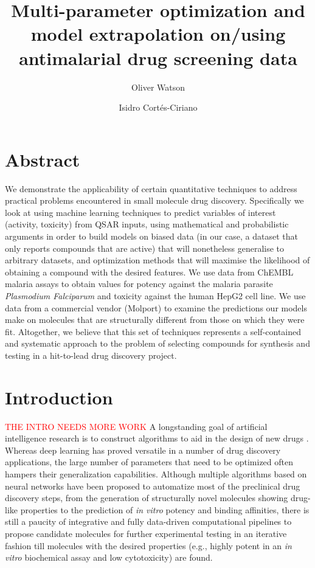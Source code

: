 \documentclass{article}
\title{Multi-parameter optimization and model extrapolation on/using antimalarial drug screening data}
\author[1]{Oliver Watson}
\author[2]{Isidro Cortés-Ciriano}
\affil[1]{Evariste Technologies Ltd}
\affil[2]{Centre for Molecular Informatics, Department of Chemistry, University of Cambridge, Lensfield Road, Cambridge, CB2 1EW, United Kingdom.}
\begin{document}

\maketitle

\section{Abstract}

We demonstrate the applicability of certain quantitative techniques to address practical problems encountered in small molecule drug discovery.  Specifically we look at using machine learning techniques to predict variables of interest (activity, toxicity) from QSAR inputs, using mathematical and probabilistic arguments in order to build models on biased data (in our case, a dataset that only reports compounds that are active) that will nonetheless generalise to arbitrary datasets, and optimization methods that will maximise the likelihood of obtaining a compound with the desired features.  We use data from ChEMBL malaria assays to obtain values for potency against the malaria parasite \textit{Plasmodium Falciparum} and toxicity against the human HepG2 cell line.  We use data from a commercial vendor (Molport) to examine the predictions our models make on 
molecules that are structurally  different from those on which they were fit. Altogether, we believe that this set of techniques represents a self-contained and systematic approach to the problem of selecting compounds for synthesis and testing in a hit-to-lead drug discovery project.
\newpage


\section{Introduction}
\textcolor{red}{THE INTRO NEEDS MORE WORK}
A longstanding goal of artificial intelligence research is to construct algorithms 
to aid in the design of new drugs \cite{Gawehn2016,Chen2018}. 
Whereas deep learning has proved versatile in a number of drug discovery applications\cite{Chen2018}, 
the large number of parameters that need to be optimized often hampers their generalization capabilities. Although multiple algorithms based on neural networks have been proposed to automatize most of the preclinical drug discovery steps, from the generation of structurally novel molecules showing drug-like properties\cite{Kang2018} to the prediction of {\it in vitro} potency and binding affinities\cite{Ozturk2018}, there is still a paucity of integrative and fully data-driven computational pipelines to propose candidate molecules for further experimental testing in an iterative fashion till molecules with the desired properties (e.g., highly potent in an {\it in vitro} biochemical assay and low cytotoxicity) are found.
\end{document}
